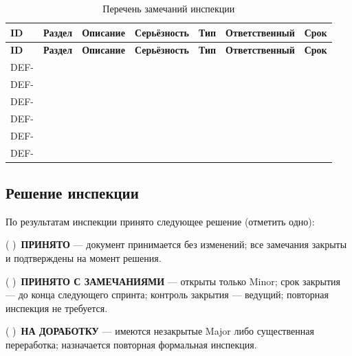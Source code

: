 \documentclass[12pt,a4paper]{article}
\begin{document}
\begin{longtable}{|
  >{\raggedright\arraybackslash}p{1.4cm}
  >{\raggedright\arraybackslash}p{1.6cm}
  >{\raggedright\arraybackslash}p{4.2cm}
  >{\raggedright\arraybackslash}p{1.5cm}
  >{\raggedright\arraybackslash}p{1.6cm}
  >{\raggedright\arraybackslash}p{1.9cm}
  >{\raggedright\arraybackslash}p{1.3cm}}
\caption{Перечень замечаний инспекции}\\
\hline
\textbf{ID} & \textbf{Раздел} & \textbf{Описание} & \textbf{Серьёзность} &
\textbf{Тип} & \textbf{Ответственный} & \textbf{Срок} \\
\hline
\endfirsthead
\hline
\textbf{ID} & \textbf{Раздел} & \textbf{Описание} & \textbf{Серьёзность} &
\textbf{Тип} & \textbf{Ответственный} & \textbf{Срок} \\
\hline
\endhead
\hline
\endfoot
\hline
\endlastfoot
DEF-\underline{\hspace{0.6cm}} & & & & & & \\
\hline
DEF-\underline{\hspace{0.6cm}} & & & & & & \\
\hline
DEF-\underline{\hspace{0.6cm}} & & & & & & \\
\hline
DEF-\underline{\hspace{0.6cm}} & & & & & & \\
\hline
DEF-\underline{\hspace{0.6cm}} & & & & & & \\
\hline
DEF-\underline{\hspace{0.6cm}} & & & & & & \\
\hline
\end{longtable}

\subsection{Решение инспекции}

По результатам инспекции принято следующее решение (отметить одно):

\medskip
\noindent( )~\textbf{ПРИНЯТО} --- документ принимается без изменений; все
замечания закрыты и подтверждены на момент решения.

\medskip
\noindent( )~\textbf{ПРИНЯТО С ЗАМЕЧАНИЯМИ} --- открыты только Minor;
срок закрытия --- до конца следующего спринта; контроль закрытия --- ведущий;
повторная инспекция не требуется.

\medskip
\noindent( )~\textbf{НА ДОРАБОТКУ} --- имеются незакрытые Major либо
существенная переработка; назначается повторная формальная инспекция.
\end{document}
